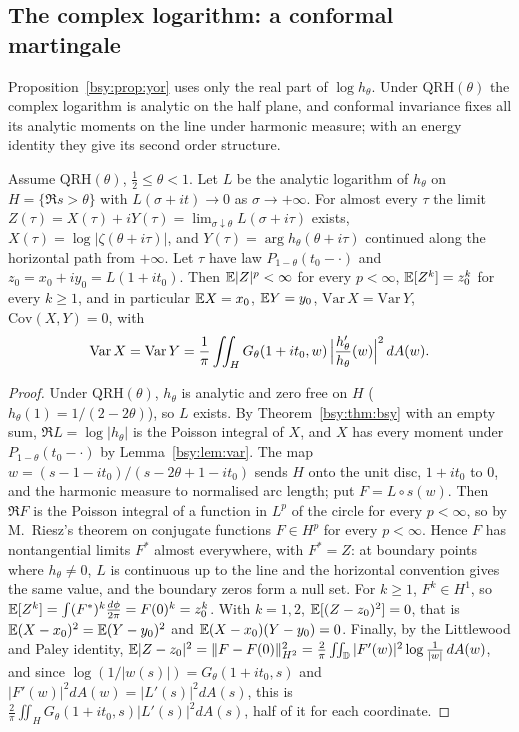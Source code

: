 \subsection{The complex logarithm: a conformal martingale}\label{bsy:sec:cmart}

Proposition~\ref{bsy:prop:yor} uses only the real part of $\log h_\theta$. Under $\mathrm{QRH}(\theta)$ the complex logarithm is analytic on the half plane, and conformal invariance fixes all its analytic moments on the line under harmonic measure; with an energy identity they give its second order structure.

\begin{theorem}\label{bsy:thm:cmart}
Assume $\mathrm{QRH}(\theta)$, $\frac12\le\theta<1$. Let $L$ be the analytic logarithm of $h_\theta$ on $H=\{\Re s>\theta\}$ with $L(\sigma+it)\to0$ as $\sigma\to+\infty$. For almost every $\tau$ the limit $Z(\tau)=X(\tau)+iY(\tau)=\lim_{\sigma\downarrow\theta}L(\sigma+i\tau)$ exists, $X(\tau)=\log|\zeta(\theta+i\tau)|$, and $Y(\tau)=\arg h_\theta(\theta+i\tau)$ continued along the horizontal path from $+\infty$. Let $\tau$ have law $P_{1-\theta}(t_0-\cdot)$ and $z_0=x_0+iy_0=L(1+it_0)$. Then $\mathbb{E}|Z|^p<\infty$ for every $p<\infty$, $\mathbb{E}[Z^k]=z_0^k$ for every $k\ge1$, and in particular $\mathbb{E} X=x_0$, $\mathbb{E} Y=y_0$, $\mathrm{Var}\,X=\mathrm{Var}\,Y$, $\mathrm{Cov}(X,Y)=0$, with
\[
\mathrm{Var}\,X=\mathrm{Var}\,Y=\frac1\pi\iint_{H}G_\theta(1+it_0,w)\,\Bigl|\frac{h_\theta'}{h_\theta}(w)\Bigr|^2\,dA(w).
\]
\end{theorem}

\begin{proof}
Under $\mathrm{QRH}(\theta)$, $h_\theta$ is analytic and zero free on $H$ ($h_\theta(1)=1/(2-2\theta)$), so $L$ exists. %
By Theorem~\ref{bsy:thm:bsy} with an empty sum, $\Re L=\log|h_\theta|$ is the Poisson integral of $X$, and $X$ has every moment under $P_{1-\theta}(t_0-\cdot)$ by Lemma~\ref{bsy:lem:var}. The map $w=(s-1-it_0)/(s-2\theta+1-it_0)$ sends $H$ onto the unit disc, $1+it_0$ to $0$, and the harmonic measure to normalised arc length; put $F=L\circ s(w)$. Then $\Re F$ is the Poisson integral of a function in $L^p$ of the circle for every $p<\infty$, so by M.~Riesz's theorem on conjugate functions \cite[Theorem 4.1]{Duren70} $F\in H^p$ for every $p<\infty$. Hence $F$ has nontangential limits $F^*$ almost everywhere, with $F^*=Z$: at boundary points where $h_\theta\ne0$, $L$ is continuous up to the line and the horizontal convention gives the same value, and the boundary zeros form a null set. For $k\ge1$, $F^k\in H^1$, so $\mathbb{E}[Z^k]=\int(F^*)^k\frac{d\phi}{2\pi}=F(0)^k=z_0^k$. With $k=1,2$, $\mathbb{E}[(Z-z_0)^2]=0$, that is $\mathbb{E}(X-x_0)^2=\mathbb{E}(Y-y_0)^2$ and $\mathbb{E}(X-x_0)(Y-y_0)=0$. Finally, by the Littlewood and Paley identity, $\mathbb{E}|Z-z_0|^2=\|F-F(0)\|_{H^2}^2=\frac2\pi\iint_{\mathbb D}|F'(w)|^2\log\frac1{|w|}\,dA(w)$, and since $\log(1/|w(s)|)=G_\theta(1+it_0,s)$ and $|F'(w)|^2dA(w)=|L'(s)|^2dA(s)$, this is $\frac2\pi\iint_HG_\theta(1+it_0,s)|L'(s)|^2dA(s)$, half of it for each coordinate.
\end{proof}

